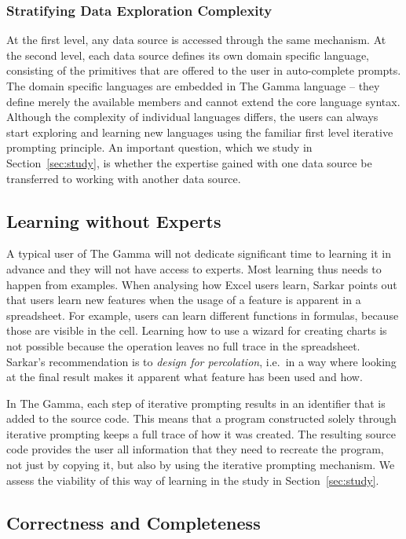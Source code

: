 \documentclass[manuscript,review,anonymous]{acmart}
\begin{document}
\subsubsection*{Stratifying Data Exploration Complexity}
At the first level, any data source is accessed through the same mechanism. At the second level,
each data source defines its own domain specific language, consisting of the primitives that are
offered to the user in auto-complete prompts. The domain specific languages are embedded in The Gamma
language -- they define merely the available members and cannot extend the core language syntax.
Although the complexity of individual languages differs, the users can always start exploring
and learning new languages using the familiar first level iterative prompting principle.
An important question, which we study in Section~\ref{sec:study}, is whether the expertise gained
with one data source be transferred to working with another data source.

\subsection{Learning without Experts}
\label{sec:design-expert}

A typical user of The Gamma will not dedicate significant time to learning it in advance and
they will not have access to experts. Most learning thus needs to happen from examples.
When analysing how Excel users learn, Sarkar \cite{learning} points out that users learn new
features when the usage of a feature is apparent in a spreadsheet. For example, users can learn
different functions in formulas, because those are visible in the cell. Learning how to use a
wizard for creating charts is not possible because the operation leaves no full trace in the
spreadsheet. Sarkar's recommendation is to \emph{design for percolation},
i.e.~in a way where looking at the final result makes it apparent what feature has been used and how.

In The Gamma, each step of iterative prompting results in an identifier that is
added to the source code. This means that a program constructed solely through iterative prompting
keeps a full trace of how it was created. The resulting source code provides the user all
information that they need to recreate the program, not just by copying it, but also by using the
iterative prompting mechanism. We assess the viability of this way of learning in the study in
Section~\ref{sec:study}.

\subsection{Correctness and Completeness}
\label{sec:design-cc}
\end{document}
